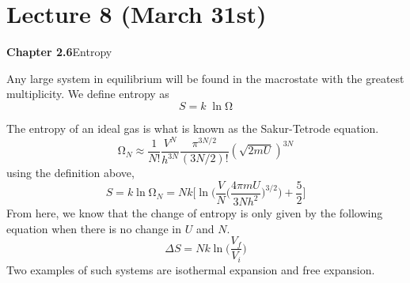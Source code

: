 \section{Lecture 8 (March 31st)}
{\bf Chapter 2.6}\hspace{2ex}Entropy
\begin{defi}
Any large system in equilibrium will be found in the macrostate with the greatest multiplicity. We define entropy as
\[S=k\;\ln \mathrm{\Omega} \]
\end{defi}
\vspace{2ex}
\begin{ex}
The entropy of an ideal gas is what is known as the Sakur-Tetrode equation.
\[\mathrm{\Omega} _{N}\approx \dfrac{1}{N!}\dfrac{V^{N}}{h^{3N}}\dfrac{\pi^{3N/2}}{(3N/2)!}(\sqrt{2mU})^{3N}\]
using the definition above,
\[S=k\ln\mathrm{\Omega} _{N}=Nk\Big[\ln\Big(\dfrac{V}{N}\Big(\dfrac{4\pi mU}{3Nh^2}\Big)^{3/2}\Big)+\dfrac{5}{2}\Big]\]
From here, we know that the change of entropy is only given by the following equation when there is no change in $U$ and $N$.
\[\Delta S=Nk\ln\Big(\dfrac{V_{f}}{V_{i}}\Big)\]
Two examples of such systems are isothermal expansion and free expansion.
\end{ex}
\vspace{2ex}

